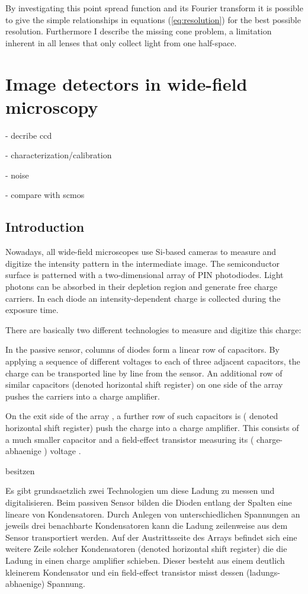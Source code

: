 By investigating this point spread function and its Fourier transform
it is possible to give the simple relationships in equations
(\ref{eq:resolution}) for the best possible resolution. Furthermore I
describe the missing cone problem, a limitation inherent in all lenses
that only collect light from one half-space.



\section{Image detectors in wide-field microscopy}
\label{sec:ccd-intro}
\begin{summary}
- decribe ccd

- characterization/calibration

- noise

- compare with scmos
\end{summary}

\subsection{Introduction}
Nowadays, all wide-field microscopes use Si-based cameras to measure   
and digitize the intensity pattern in the intermediate image. The
semiconductor surface is patterned with a two-dimensional array of PIN
photodiodes. Light photons can be absorbed in their depletion region
and generate free charge carriers. In each diode an
intensity-dependent charge is collected during the exposure time.

There are basically two different technologies to measure and digitize
this charge:

In the passive sensor, columns of diodes form a linear row of
 capacitors. By applying a sequence of different voltages to
each of three adjacent capacitors, the charge can be transported line
by line from the sensor. An additional row of similar capacitors
(denoted horizontal shift register) on one side of the array pushes
the carriers into a charge amplifier. 

On the exit side of the array , a further row of such capacitors is (
denoted horizontal shift register) push the charge into a charge
amplifier. This consists of a much smaller capacitor and a
field-effect transistor measuring its ( charge- abhaenige ) voltage .


besitzen

Es gibt grundsaetzlich zwei Technologien um diese Ladung zu messen und
digitalisieren. Beim passiven Sensor bilden die Dioden entlang der
Spalten eine lineare von Kondensatoren. Durch Anlegen von
unterschiedlichen Spannungen an jeweils drei benachbarte Kondensatoren
kann die Ladung zeilenweise aus dem Sensor transportiert werden. Auf
der Austrittsseite des Arrays befindet sich eine weitere Zeile solcher
Kondensatoren (denoted horizontal shift register) die die Ladung in
einen charge amplifier schieben. Dieser besteht aus einem deutlich
kleinerem Kondensator und ein field-effect transistor misst dessen
(ladungs-abhaenige) Spannung.

